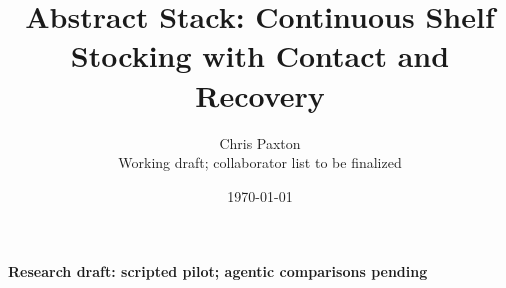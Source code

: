 \documentclass[10pt,letterpaper]{article}
\title{Abstract Stack: Continuous Shelf Stocking with Contact and Recovery}
\author{Chris Paxton\\\small Working draft; collaborator list to be finalized}
\date{\today}
\newcommand{\draftstatus}{Research draft: scripted pilot; agentic comparisons pending}
\begin{document}
\maketitle
\begin{center}\small\textbf{\draftstatus}\end{center}










\appendix

\end{document}
